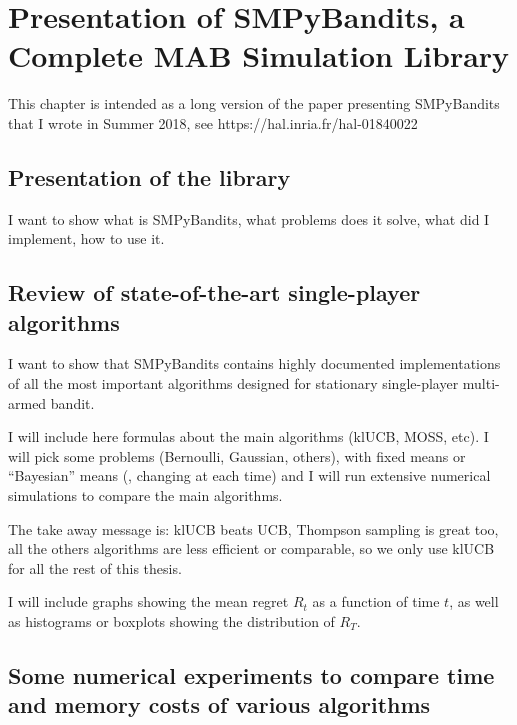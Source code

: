 
\chapter{Presentation of SMPyBandits, a Complete MAB Simulation Library}
\label{chapter:3}
\minitoc
\newpage
\graphicspath{{2-Chapters/3-Chapter/Images/}}

This chapter is intended as a long version of the paper presenting SMPyBandits that I wrote in Summer 2018, see https://hal.inria.fr/hal-01840022

\section{Presentation of the library}
\label{sec:3:presentationLibrary}

I want to show what is SMPyBandits, what problems does it solve, what did I implement, how to use it.

\section{Review of state-of-the-art single-player algorithms}
\label{sec:3:reviewSPAlgorithms}

I want to show that SMPyBandits contains highly documented implementations of all the most important algorithms designed for stationary single-player multi-armed bandit.

I will include here formulas about the main algorithms (klUCB, MOSS, etc).
I will pick some problems (Bernoulli, Gaussian, others), with fixed means or ``Bayesian'' means (\ie, changing at each time) and I will run extensive numerical simulations to compare the main algorithms.

The take away message is: klUCB beats UCB, Thompson sampling is great too, all the others algorithms are less efficient or comparable, so we only use klUCB for all the rest of this thesis.

I will include graphs showing the mean regret $R_t$ as a function of time $t$, as well as histograms or boxplots showing the distribution of $R_T$.


\section{Some numerical experiments to compare time and memory costs of various algorithms}
\label{sec:3:timeAndMemoryCosts}

